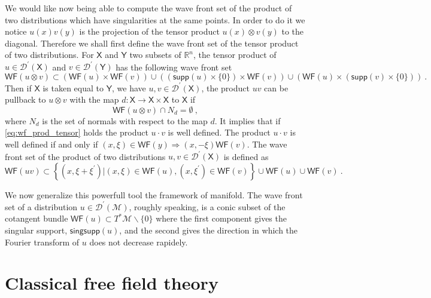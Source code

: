 \documentclass[10pt]{book}
\newcommand{\supp}{\mathsf{supp}}
\newcommand{\singsupp}{\mathsf{singsupp}}
\newcommand{\WF}{\mathsf{WF}}
\newcommand{\Dcal}{\mathcal{D}}
\newcommand{\Mcal}{\mathcal{M}}
\newcommand{\Rbb}{\mathbb{R}}
\newcommand{\Xsf}{\mathsf{X}}
\newcommand{\Ysf}{\mathsf{Y}}
\theoremstyle{break}
\begin{document}
We would like now being able to compute the wave front set of the product of two distributions which have singularities at the same points. In order to do it we notice $u(x)v(y)$ is the projection of the tensor product $u(x) \otimes v(y)$ to the diagonal. Therefore we shall first define the wave front set of the tensor product of two distributions. For $\Xsf$ and $\Ysf$ two subsets of $\Rbb^n$, the tensor product of $u\in\Dcal^\prime(\Xsf)$ and $v\in\Dcal^\prime(\Ysf)$ has the following wave front set
%
\begin{equation*}
\WF(u \otimes v) \subset \left( \WF(u) \times \WF(v) \right) \cup \left( \left( \supp(u) \times \{0\} \right) \times \WF(v) \right) \cup \left( \WF(u) \times \left( \supp(v) \times \{0\} \right) \right) \ . 
\end{equation*}
%
Then if $\Xsf$ is taken equal to $\Ysf$, we have $u, v \in \Dcal^\prime(\Xsf)$, the product $u v$ can be pullback to $u\otimes v$ with the map $d : \Xsf \to \Xsf \times \Xsf$ to $\Xsf$ if 
%
\begin{equation*}
\WF(u\otimes v) \cap N_d = \emptyset \ , 
\label{eq:wf_prod_tensor}
\end{equation*}
%
where $N_d$ is the set of normals with respect to the map $d$. It implies that if \eqref{eq:wf_prod_tensor} holds the product $u \cdot v$ is well defined. The product $u \cdot v$ is well defined if and only if $(x,\xi) \in \WF(y) \Rightarrow (x,-\xi) \WF(v)$. The wave front set of the product of two distributions $u, v \in \Dcal^\prime(\Xsf)$ is defined as
%
\begin{equation*}
\WF(u v) \subset \left\{ (x,\xi+\xi^\prime) | (x,\xi) \in \WF(u) , (x,\xi^\prime) \in \WF(v) \right\} \cup \WF(u) \cup \WF(v) \ . 
\end{equation*}


\bigskip


We now generalize this powerfull tool the framework of manifold. The wave front set of a distribution $u \in \Dcal^\prime(\Mcal)$, roughly speaking, is a conic subset of the cotangent bundle $\WF(u) \subset T^\ast\Mcal\backslash\{0\}$ where the first component gives the singular support, $\singsupp(u)$, and the second gives the direction in which the Fourier transform of $u$ does not decrease rapidely. 




\section{Classical free field theory}
\end{document}
